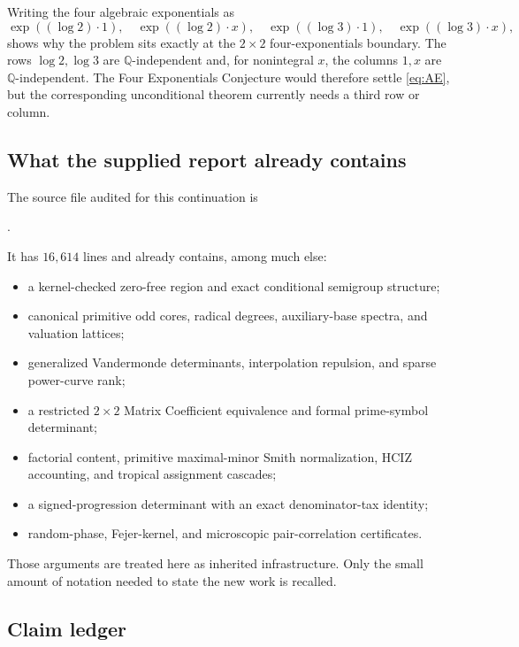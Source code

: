 \documentclass[11pt,oneside]{article}
\theoremstyle{definition}
\theoremstyle{remark}
\newcommand{\Q}{\mathbb{Q}}
\begin{document}
Writing the four algebraic exponentials as
\[
 \exp((\log2)\cdot1),\quad \exp((\log2)\cdot x),\quad
 \exp((\log3)\cdot1),\quad \exp((\log3)\cdot x),
\]
shows why the problem sits exactly at the $2\times2$ four-exponentials boundary.  The rows $\log2,\log3$ are $\Q$-independent and, for nonintegral $x$, the columns $1,x$ are $\Q$-independent.  The Four Exponentials Conjecture would therefore settle \eqref{eq:AE}, but the corresponding unconditional theorem currently needs a third row or column.

\subsection{What the supplied report already contains}

The source file audited for this continuation is
\begin{center}
.
\end{center}
It has $16{,}614$ lines and already contains, among much else:
\begin{itemize}
\item a kernel-checked zero-free region and exact conditional semigroup structure;
\item canonical primitive odd cores, radical degrees, auxiliary-base spectra, and valuation lattices;
\item generalized Vandermonde determinants, interpolation repulsion, and sparse power-curve rank;
\item a restricted $2\times2$ Matrix Coefficient equivalence and formal prime-symbol determinant;
\item factorial content, primitive maximal-minor Smith normalization, HCIZ accounting, and tropical assignment cascades;
\item a signed-progression determinant with an exact denominator-tax identity;
\item random-phase, Fejer-kernel, and microscopic pair-correlation certificates.
\end{itemize}
Those arguments are treated here as inherited infrastructure.  Only the small amount of notation needed to state the new work is recalled.

\subsection{Claim ledger}
\end{document}

